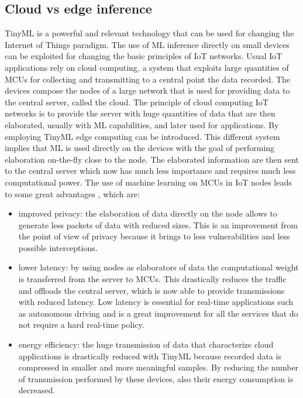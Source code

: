 \documentclass[12pt]{report}
\begin{document}
\subsection{Cloud vs edge inference}
TinyML is a powerful and relevant technology that can be used for changing the Internet of Things paradigm. The use of ML inference directly on small devices can be exploited for changing the basic principles of IoT networks. Usual IoT applications rely on cloud computing, a system that exploits large quantities of MCUs for collecting and transmitting to a central point the data recorded. The devices compose the nodes of a large network that is used for providing data to the central server, called the cloud. The principle of cloud computing IoT networks is to provide the server with huge quantities of data that are then elaborated, usually with ML capabilities, and later used for applications. By employing TinyML edge computing can be introduced. This different system implies that ML is used directly on the devices with the goal of performing elaboration on-the-fly close to the node. The elaborated information are then sent to the central server which now has much less importance and requires much less computational power. The use of machine learning on MCUs in IoT nodes leads to some great advantages \cite{yu2017survey}, which are:

\begin{itemize}
\item improved privacy: the elaboration of data directly on the node allows to generate less packets of data with reduced sizes. This is an improvement from the point of view of privacy because it brings to less vulnerabilities and less possible interceptions.
\item lower latency: by using nodes as elaborators of data the computational weight is transferred from the server to MCUs. This drastically reduces the traffic and offloads the central server, which is now able to provide transmissions with reduced latency. Low latency is essential for real-time applications such as autonomous driving and is a great improvement for all the services that do not require a hard real-time policy.
\item energy efficiency: the huge transmission of data that characterize cloud applications is drastically reduced with TinyML because recorded data is compressed in smaller and more meaningful samples. By reducing the number of transmission performed by these devices, also their energy consumption is decreased.
\end{itemize}
\end{document}
